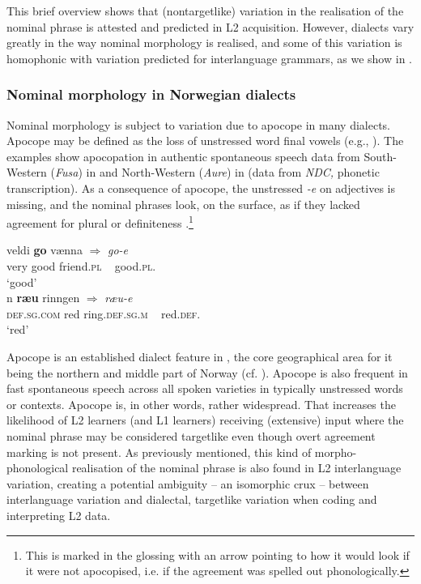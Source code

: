\documentclass[output=paper,colorlinks,citecolor=brown,modfonts,nonflat]{../langscibook}
\begin{document}
This brief overview shows that (nontargetlike) variation in the realisation of the nominal phrase is attested and predicted in L2 acquisition. However,  dialects vary greatly in the way nominal morphology is realised, and some of this variation is homophonic with variation predicted for interlanguage grammars, as we show in .

\subsubsection{Nominal morphology in Norwegian dialects}\label{sec:emilsen:3.1.3}

Nominal morphology is subject to variation due to apocope in many  dialects. Apocope may be defined as the loss of unstressed word final vowels (e.g., \citealt[76, 106]{MæhlumRøyneland2012}). The examples show apocopation in authentic spontaneous speech data from South-Western  (\textit{Fusa}) in  and North-Western  (\textit{Aure}) in  (data from \textit{NDC,} phonetic transcription). As a consequence of apocope, the unstressed \textit{{}-e} on adjectives is missing, and the nominal phrases look, on the surface, as if they lacked agreement for plural  or definiteness .\footnote{{This is marked in the glossing with an arrow pointing to how it would look if it were not apocopised, i.e. if the agreement was spelled out phonologically.}}


\ea%
    \label{ex:emilsen:3}
\gll veldi \textbf{go} vænna ${\Rightarrow}$ \textit{go-e} \\
 very good  friend.\textsc{pl} ~ good.\textsc{pl}. \\
  \hphantom{~${\Rightarrow}$~} ‘good’ \\

\ex%
    \label{ex:emilsen:4}
\gll n \textbf{ræu} rinngen ${\Rightarrow}$ \textit{ræu-e} \\
 \textsc{def}.\textsc{sg}.\textsc{com} red  ring.\textsc{def}.\textsc{sg}.\textsc{m} ~ red.{\textsc{def}}. \\
  \hspace{2.9cm} ‘red’ \\
\z


Apocope is an established dialect feature in , the core geographical area for it being the northern and middle part of Norway (cf. \citealt[76]{MæhlumRøyneland2012}). Apocope is also frequent in fast spontaneous speech across all spoken varieties in typically unstressed words or contexts. Apocope is, in other words, rather widespread. That increases the likelihood of L2 learners (and L1 learners) receiving (extensive) input where the nominal phrase may be considered targetlike even though overt agreement marking is not present. As previously mentioned, this kind of morpho-phonological realisation of the nominal phrase is also found in L2 interlanguage variation, creating a potential ambiguity – an isomorphic crux – between interlanguage variation and dialectal, targetlike variation when coding and interpreting L2 data.  
\end{document}
